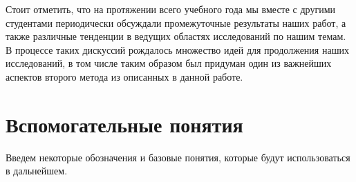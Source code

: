 \documentclass[a4paper]{article}
\theoremstyle{definition}
\begin{document}
    Стоит отметить, что на протяжении всего учебного года мы вместе с другими студентами периодически обсуждали промежуточные результаты наших работ, а также различные тенденции в ведущих областях исследований по нашим темам. В процессе таких дискуссий рождалось множество идей для продолжения наших исследований, в том числе таким образом был придуман один из важнейших аспектов второго метода из описанных в данной работе.


    \newpage

    \section{Вспомогательные понятия}


    Введем некоторые обозначения и базовые понятия, которые будут использоваться в дальнейшем.
\vspace*{0.3cm}
\end{document}
